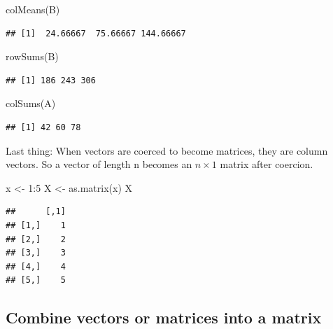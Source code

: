 \documentclass[
]{book}
\newenvironment{Shaded}{\begin{snugshade}}{\end{snugshade}}
\newcommand{\DecValTok}[1]{\textcolor[rgb]{0.00,0.00,0.81}{#1}}
\newcommand{\FunctionTok}[1]{\textcolor[rgb]{0.00,0.00,0.00}{#1}}
\newcommand{\NormalTok}[1]{#1}
\newcommand{\OtherTok}[1]{\textcolor[rgb]{0.56,0.35,0.01}{#1}}
\newcommand{\SpecialCharTok}[1]{\textcolor[rgb]{0.00,0.00,0.00}{#1}}
\begin{document}
\begin{Shaded}
\begin{Highlighting}[]
\FunctionTok{colMeans}\NormalTok{(B)}
\end{Highlighting}
\end{Shaded}

\begin{verbatim}
## [1]  24.66667  75.66667 144.66667
\end{verbatim}

\begin{Shaded}
\begin{Highlighting}[]
\FunctionTok{rowSums}\NormalTok{(B)}
\end{Highlighting}
\end{Shaded}

\begin{verbatim}
## [1] 186 243 306
\end{verbatim}

\begin{Shaded}
\begin{Highlighting}[]
\FunctionTok{colSums}\NormalTok{(A)}
\end{Highlighting}
\end{Shaded}

\begin{verbatim}
## [1] 42 60 78
\end{verbatim}

Last thing: When vectors are coerced to become matrices, they are column vectors. So a vector of length n becomes an \(n \times 1\) matrix after coercion.

\begin{Shaded}
\begin{Highlighting}[]
\NormalTok{x }\OtherTok{\textless{}{-}} \DecValTok{1}\SpecialCharTok{:}\DecValTok{5}
\NormalTok{X }\OtherTok{\textless{}{-}} \FunctionTok{as.matrix}\NormalTok{(x)}
\NormalTok{X}
\end{Highlighting}
\end{Shaded}

\begin{verbatim}
##      [,1]
## [1,]    1
## [2,]    2
## [3,]    3
## [4,]    4
## [5,]    5
\end{verbatim}

\hypertarget{combine-vectors-or-matrices-into-a-matrix}{%
\subsection{Combine vectors or matrices into a matrix}\label{combine-vectors-or-matrices-into-a-matrix}}
\end{document}
